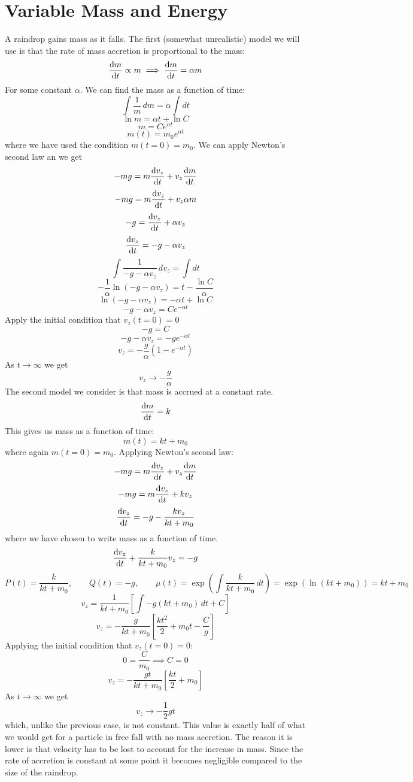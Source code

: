 \documentclass{article}
\begin{document}
    \section{Variable Mass and Energy}
    \example
    A raindrop gains mass as it falls.
    The first (somewhat unrealistic) model we will use is that the rate of mass accretion is proportional to the mass:
    \[\dv{m}{t} \propto m \implies \dv{m}{t} = \alpha m\]
    For some constant \(\alpha\).
    We can find the mass as a function of time:
    \[\int \frac{1}{m}\,dm = \alpha\int dt\]
    \[\ln m = \alpha t + \ln C\]
    \[m = Ce^{\alpha t}\]
    \[m(t) = m_0e^{\alpha t}\]
    where we have used the condition \(m(t=0) = m_0\).
    We can apply Newton's second law an we get
    \[-mg = m\dv{v_z}{t} + v_z\dv{m}{t}\]
    \[-mg = m\dv{v_z}{t} + v_z\alpha m\]
    \[-g = \dv{v_z}{t} + \alpha v_z\]
    \[\dv{v_z}{t} = -g - \alpha v_z\]
    \[\int\frac{1}{-g - \alpha v_z}\,dv_z = \int dt\]
    \[-\frac{1}{\alpha}\ln(-g-\alpha v_z) = t - \frac{\ln C}{\alpha}\]
    \[\ln(-g - \alpha v_z) = -\alpha t + \ln C\]
    \[-g - \alpha v_z = Ce^{-\alpha t}\]
    Apply the initial condition that \(v_z(t = 0) = 0\)
    \[-g = C\]
    \[-g - \alpha v_z = -ge^{-\alpha t}\]
    \[v_z = -\frac{g}{\alpha}\left(1 - e^{-\alpha t}\right)\]
    As \(t\to \infty\) we get
    \[v_z \to -\frac{g}{\alpha}\]
    The second model we consider is that mass is accrued at a constant rate.
    \[\dv{m}{t} = k\]
    This gives us mass as a function of time:
    \[m(t) = kt + m_0\]
    where again \(m(t = 0) = m_0\).
    Applying Newton's second law:
    \[-mg = m\dv{v_z}{t} + v_z\dv{m}{t}\]
    \[-mg = m\dv{v_z}{t} + kv_z\]
    \[\dv{v_z}{t} = -g - \frac{kv_z}{kt + m_0}\]
    where we have chosen to write mass as a function of time.
    \[\dv{v_z}{t} + \frac{k}{kt + m_0}v_z = -g\]
    \[P(t) = \frac{k}{kt + m_0},\qquad Q(t) = -g,\qquad \mu(t) = \exp\left(\int \frac{k}{kt + m_0} \,dt\right) = \exp(\ln(kt + m_0)) = kt + m_0\]
    \[v_z = \frac{1}{kt + m_0}\left[\int -g(kt + m_0)\,dt + C\right]\]
    \[v_z = -\frac{g}{kt + m_0}\left[\frac{kt^2}{2} + m_0t - \frac{C}{g}\right]\]
    Applying the initial condition that \(v_z(t=0) = 0\):
    \[0 = \frac{C}{m_0}\implies C = 0\]
    \[v_z = -\frac{gt}{kt + m_0}\left[\frac{kt}{2} + m_0\right]\]
    As \(t\to \infty\) we get
    \[v_z\to -\frac{1}{2}gt\]
    which, unlike the previous case, is not constant.
    This value is exactly half of what we would get for a particle in free fall with no mass accretion.
    The reason it is lower is that velocity has to be lost to account for the increase in mass.
    Since the rate of accretion is constant at some point it becomes negligible compared to the size of the raindrop.
    
\end{document}
